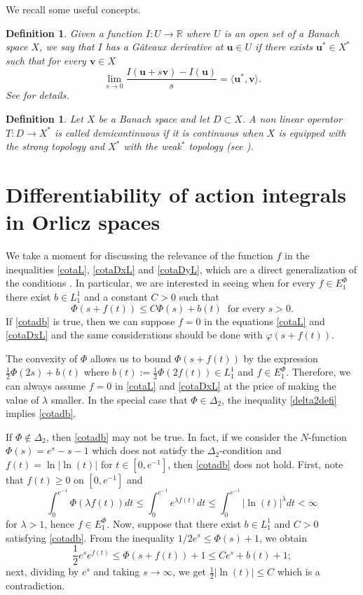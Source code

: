 \documentclass[twoside]{elsarticle}
\newtheorem{defi}[thm]{Definition}
\theoremstyle{remark}
\newcommand{\ephi}{E^{\Phi}}
\renewcommand{\b}[1]{\boldsymbol{#1}}
\renewcommand{\leq}{\leqslant}
\begin{document}
  We recall some useful concepts.

	\begin{defi} 
	Given a function $I:U\to\mathbb{R}$ where $U$ is an open set of a Banach space $X$,
we say that $I$ has a G\^ateaux derivative at $\b{u} \in U$ if there exists $\b{u}^*\in X^*$ such that for every $\b{v} \in X$
\[
\lim_{s \rightarrow 0}\frac{I(\b{u}+s\b{v})-I(\b{u}) }{s}=\langle \b{u}^* , \b{v}\rangle.
\]
See \cite{ambrosetti} for details. 
\end{defi}

\begin{defi} Let $X$ be a Banach space and let $D\subset X$. A non linear operator $T:D\to X^*$ is called \emph{demicontinuous} if it is continuous when $X$ is equipped with the strong topology and $X^*$ with the weak${}^*$ topology 
(see \cite{kato1964demicontinuity}).
\end{defi} 

\section{Differentiability of action integrals in Orlicz spaces}\label{sec:dif}





We take a moment for  discussing the relevance of the function $f$ in the inequalities \eqref{cotaL},  \eqref{cotaDxL} and \eqref{cotaDyL}, which are a direct  generalization of the conditions \cite[Eq (a), p. 10]{mawhin2010critical}.  In particular, we are interested in seeing when for every  $f\in \ephi_1$ there exist
$b\in L^1_1$ and a constant $C>0$ such that 
\begin{equation}\label{cotadb}
\Phi(s+f(t))\leq C\Phi(s)+b(t)\;\;\mbox{for every}\;s>0.
\end{equation} 
If \eqref{cotadb} is true, then we can suppose $f=0$  in the equations \eqref{cotaL} and \eqref{cotaDxL} and the same considerations should be done with $\varphi\left(s+f(t)\right)$.

 The convexity of $\Phi$ allows us to bound  $\Phi(s+f(t))$ by the expression  $\frac12\Phi(2s)+b(t)$ where $b(t):=\tfrac12\Phi(2f(t))\in L^1_1$ and $f\in \ephi_1$. Therefore, we can always assume $f = 0$ in \eqref{cotaL} and \eqref{cotaDxL} at the price of making  the value of $\lambda$ smaller. In the special case that $\Phi\in\Delta_2$, the inequality \eqref{delta2defi} implies \eqref{cotadb}. 

 If $\Phi\notin\Delta_2$, then \eqref{cotadb}  may not be true.  In fact,  if we consider the $N$-function $\Phi(s)=e^s-s-1$ which does not satisfy the $\Delta_2$-condition and $f(t)=\ln|\ln(t)|$ for $t\in [0,e^{-1}]$, then \eqref{cotadb} does not hold.  First, note that $f(t)\geq 0$ on $[0,e^{-1}]$ and 
\[\int_0^{e^{-1}}\Phi(\lambda f(t))dt\leq 
\int_0^{e^{-1}} e^{\lambda f(t)}dt\leq \int_0^{e^{-1}}|\ln(t)|^{\lambda}dt<\infty\]
for $\lambda>1$, hence $f\in\ephi_1$. 
Now, suppose that there exist $b\in L^1_1$ and $C>0$ satisfying \eqref{cotadb}. 
From the inequality $1/2 e^s\leq \Phi(s)+1$, we obtain
\[\frac12 e^s e^{f(t)}\leq \Phi(s+f(t))+1\leq Ce^s+b(t)+1;\]
next, dividing by $e^s$ and taking $s\to\infty$, we get $\tfrac12|\ln(t)|\leq C$ which is a contradiction. 
\end{document}
